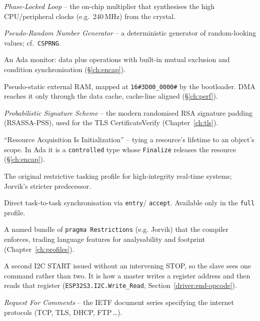 \begin{description}[style=nextline, leftmargin=0pt]
\item[PLL] \emph{Phase-Locked Loop} -- the on-chip multiplier that synthesises the high CPU/peripheral clocks (e.g.\ 240\,MHz) from the crystal.

\item[PRNG] \emph{Pseudo-Random Number Generator} -- a deterministic generator of random-looking values; cf.\ \texttt{CSPRNG}.

\item[protected object] An Ada monitor: data plus operations with built-in mutual
  exclusion and condition synchronisation (\S\ref{ch:encap}).

\item[PSRAM] Pseudo-static external RAM, mapped at \texttt{16\#3D00\_0000\#} by the
  bootloader. DMA reaches it only through the data cache, cache-line aligned
  (\S\ref{ch:perf}).

\item[PSS] \emph{Probabilistic Signature Scheme} -- the modern randomised RSA signature padding (RSASSA-PSS), used for the TLS CertificateVerify (Chapter~\ref{ch:tls}).

\item[RAII] ``Resource Acquisition Is Initialization'' -- tying a resource's
  lifetime to an object's scope. In Ada it is a \texttt{controlled} type whose
  \texttt{Finalize} releases the resource (\S\ref{ch:encap}).

\item[Ravenscar] The original restrictive tasking profile for high-integrity
  real-time systems; Jorvik's stricter predecessor.

\item[rendezvous] Direct task-to-task synchronisation via \texttt{entry}/
  \texttt{accept}. Available only in the \texttt{full} profile.

\item[restriction profile] A named bundle of \texttt{pragma Restrictions} (e.g.
  Jorvik) that the compiler enforces, trading language features for analysability
  and footprint (Chapter~\ref{ch:profiles}).

\item[repeated START] A second I2C START issued without an intervening STOP, so the slave sees one command rather than two. It is how a master writes a register address and then reads that register (\texttt{ESP32S3.I2C.Write\_Read}, Section~\ref{driver:end-opcode}).

\item[RFC] \emph{Request For Comments} -- the IETF document series specifying the internet protocols (TCP, TLS, DHCP, FTP\,\dots).


\end{description}

